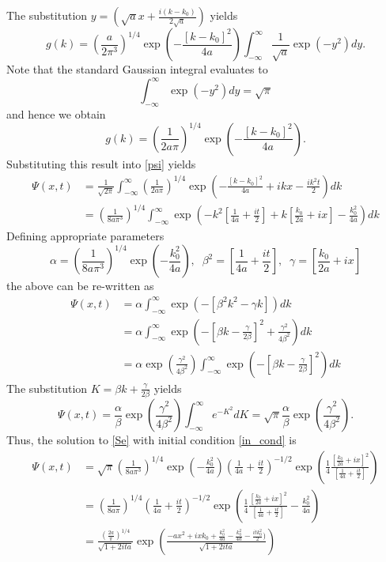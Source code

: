 \documentclass[11pt]{article}
\begin{document}
The substitution $y = \left( \sqrt{a}x + \frac{i (k-k_0)}{2 \sqrt{a}} \right)$ yields 
$$ g(k) =  \left( \frac{a}{2\pi^3} \right)^{1/4} \exp\left(-\frac{[k-k_0]^2}{4a} \right) \int_{-\infty}^\infty \frac{1}{\sqrt{a}}  \exp({-y^2}) dy.$$
Note that the standard Gaussian integral evaluates to
$$\int_{-\infty}^\infty  \exp({-y^2}) dy= \sqrt{\pi}$$
and hence we obtain
\begin{equation}\label{g(k)_sol}
g(k) = \left( \frac{1}{2 a \pi} \right)^{1/4} \exp\left(- \frac{[k-k_0]^2}{4a} \right).
\end{equation}
Substituting this result into \eqref{psi} yields 
\begin{align*}
\Psi (x,t) &= \frac{1}{\sqrt{2 \pi}} \int_{-\infty}^\infty  \left( \frac{1}{2 a \pi} \right)^{1/4} \exp\left(- \frac{[k-k_0]^2}{4a}+ ikx - \frac{ik^2t}{2} \right) dk \\
&= \left( \frac{1}{8 a \pi^3} \right)^{1/4} \int_{-\infty}^\infty \exp\left( -k^2 \left[ \frac{1}{4a}+\frac{it}{2} \right] + k \left[ \frac{k_0}{2a} + ix \right] - \frac{k_0^2}{4a} \right) dk
\end{align*}
Defining appropriate parameters 
$$ \alpha =\left( \frac{1}{8 a \pi^3} \right)^{1/4} \exp\left(- \frac{k_0^2}{4a}\right), \; \; \beta^2 = \left[ \frac{1}{4a}+\frac{it}{2} \right], \; \; \gamma = \left[ \frac{k_0}{2a} + ix \right] $$
the above can be re-written as 
\begin{align*}
\Psi (x,t) &= \alpha \int_{-\infty}^\infty \exp\left(-[\beta^2 k^2 - \gamma k]\right)dk\\
&= \alpha \int_{-\infty}^\infty \exp\left(- \left[\beta k - \frac{\gamma}{2 \beta} \right]^2 + \frac{\gamma^2}{4 \beta^2} \right)dk \\
&= \alpha \exp\left( \frac{\gamma^2}{4 \beta^2}\right) \int_{-\infty}^\infty\exp\left( -\left[\beta k - \frac{\gamma}{2 \beta} \right]^2 \right) dk
\end{align*}
The substitution $K = \beta k + \frac{\gamma}{2 \beta}$ yields
$$ \Psi (x,t) =\frac{\alpha}{\beta} \exp\left( \frac{\gamma^2}{4 \beta^2}\right) \int_{-\infty}^\infty e^{-K^2} dK = \sqrt{\pi} \frac{\alpha}{\beta} \exp\left( \frac{\gamma^2}{4 \beta^2}\right).$$
Thus, the solution to \eqref{Se} with initial condition \eqref{in_cond} is
\begin{align*}
\Psi(x,t) &=\sqrt{\pi} \left( \frac{1}{8a \pi^3} \right)^{1/4} \exp\left(- \frac{k_0^2}{4a}\right) \left( \frac{1}{4a}+\frac{it}{2} \right)^{-1/2} \exp \left( \frac{1}{4} \frac{\left[ \frac{k_0}{2a} + ix \right]^2}{ \left[ \frac{1}{4a}+\frac{it}{2} \right]} \right) \\
&= \left( \frac{1}{8a \pi} \right)^{1/4} \left( \frac{1}{4a}+\frac{it}{2} \right)^{-1/2} \exp \left( \frac{1}{4} \frac{\left[ \frac{k_0}{2a} + ix \right]^2}{\left[ \frac{1}{4a}+\frac{it}{2} \right]} -\frac{k_0^2}{4a} \right)  \\
&= \frac{\left( \frac{2a}{\pi} \right)^{1/4}}{\sqrt{1+ 2ita}} \exp \left( \frac{-ax^2 + ixk_0+ \frac{k_0^2}{4a}- \frac{k_0^2}{4a} - \frac{itk_0^2}{2})}{\sqrt{1+ 2ita}} \right) 
\end{align*}
\end{document}
